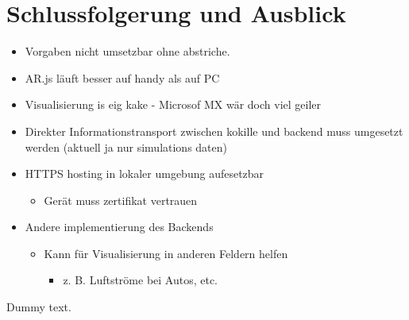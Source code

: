 \section{Schlussfolgerung und Ausblick}

\begin{itemize}
	\item Vorgaben nicht umsetzbar ohne abstriche.
	\item AR.js läuft besser auf handy als auf PC
	\item Visualisierung is eig kake - Microsof MX wär doch viel geiler
	\item Direkter Informationstransport zwischen kokille und backend muss umgesetzt werden (aktuell ja nur simulations daten)
	\item HTTPS hosting in lokaler umgebung aufesetzbar
	\begin{itemize} \renewcommand{\labelitemii}{$\Rightarrow$}
		\item Gerät muss zertifikat vertrauen
	\end{itemize}
	
	\item Andere implementierung des Backends
	\begin{itemize}
		\item Kann für Visualisierung in anderen Feldern helfen
		\begin{itemize}
			\item z. B. Luftströme bei Autos, etc.
		\end{itemize}
	\end{itemize}
\end{itemize}

Dummy text\cite{MetamorphicTesting}.
